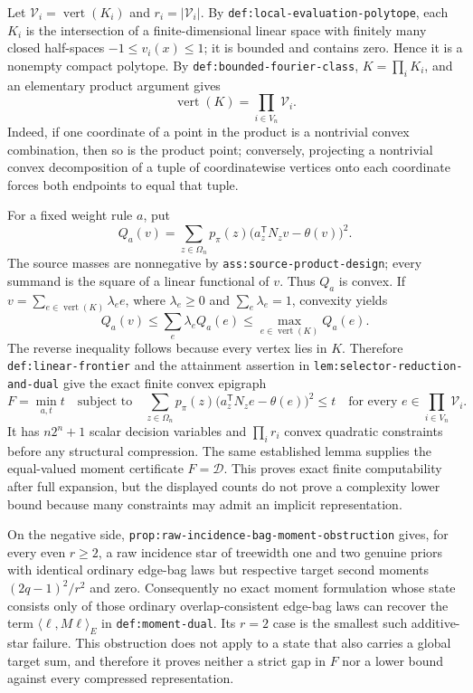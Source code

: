 Let \(\mathcal V_i=\operatorname{vert}(K_i)\) and \(r_i=|\mathcal V_i|\).  By \texttt{def:local-evaluation-polytope}, each \(K_i\) is the intersection of a finite-dimensional linear space with finitely many closed half-spaces \(-1\leq v_i(x)\leq1\); it is bounded and contains zero.  Hence it is a nonempty compact polytope.  By \texttt{def:bounded-fourier-class}, \(K=\prod_iK_i\), and an elementary product argument gives
\[
 \operatorname{vert}(K)=\prod_{i\in V_n}\mathcal V_i.
\]
Indeed, if one coordinate of a point in the product is a nontrivial convex combination, then so is the product point; conversely, projecting a nontrivial convex decomposition of a tuple of coordinatewise vertices onto each coordinate forces both endpoints to equal that tuple.

For a fixed weight rule \(a\), put
\[
 Q_a(v)=\sum_{z\in\Omega_n}p_{\pi}(z)
 \bigl(a_z^{\mathsf T}N_zv-\theta(v)\bigr)^2.
\]
The source masses are nonnegative by \texttt{ass:source-product-design}; every summand is the square of a linear functional of \(v\).  Thus \(Q_a\) is convex.  If \(v=\sum_{e\in\operatorname{vert}(K)}\lambda_e e\), where \(\lambda_e\geq0\) and \(\sum_e\lambda_e=1\), convexity yields
\[
 Q_a(v)\leq\sum_e\lambda_eQ_a(e)
 \leq\max_{e\in\operatorname{vert}(K)}Q_a(e).
\]
The reverse inequality follows because every vertex lies in \(K\).  Therefore \texttt{def:linear-frontier} and the attainment assertion in \texttt{lem:selector-reduction-and-dual} give the exact finite convex epigraph
\[
 F=\min_{a,t}t
 \quad\text{subject to}\quad
 \sum_{z\in\Omega_n}p_{\pi}(z)
 \bigl(a_z^{\mathsf T}N_ze-\theta(e)\bigr)^2\leq t
 \quad\text{for every }e\in\prod_{i\in V_n}\mathcal V_i.
\]
It has \(n2^n+1\) scalar decision variables and \(\prod_i r_i\) convex quadratic constraints before any structural compression.  The same established lemma supplies the equal-valued moment certificate \(F=\mathcal D\).  This proves exact finite computability after full expansion, but the displayed counts do not prove a complexity lower bound because many constraints may admit an implicit representation.

On the negative side, \texttt{prop:raw-incidence-bag-moment-obstruction} gives, for every even \(r\geq2\), a raw incidence star of treewidth one and two genuine priors with identical ordinary edge-bag laws but respective target second moments \((2q-1)^2/r^2\) and zero.  Consequently no exact moment formulation whose state consists only of those ordinary overlap-consistent edge-bag laws can recover the term \(\langle\ell,M\ell\rangle_E\) in \texttt{def:moment-dual}.  Its \(r=2\) case is the smallest such additive-star failure.  This obstruction does not apply to a state that also carries a global target sum, and therefore it proves neither a strict gap in \(F\) nor a lower bound against every compressed representation.